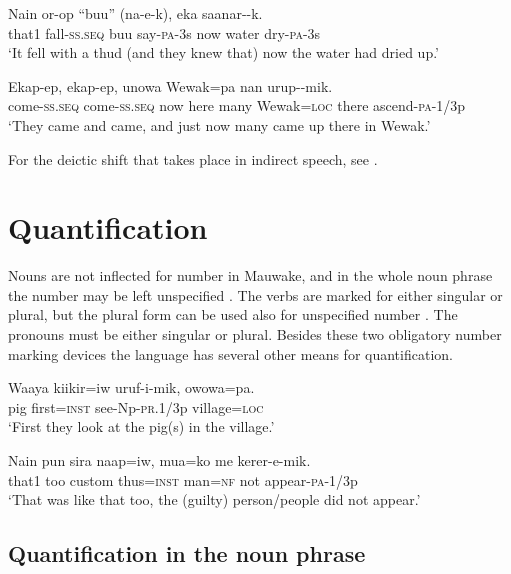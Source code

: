 \ea%
\label{ex:6:x475}
\gll Nain  or-op  ``buu''  (na-e-k),    eka  saanar--k. \\
that1  fall-\textsc{ss}.\textsc{seq}  buu  say-\textsc{pa}-3s  now  water  dry-\textsc{pa}-3s\\
\glt `It fell with a thud (and they knew that) now the water had dried up.'
\z

\ea%
\label{ex:6:x1891}
\gll Ekap-ep,  ekap-ep,     unowa  Wewak=pa nan  urup--mik.\\
come-\textsc{ss}.\textsc{seq}  come-\textsc{ss}.\textsc{seq}  now  here  many  Wewak=\textsc{loc} there  ascend-\textsc{pa}-1/3p \\
\glt `They came and came, and just now many came up there in Wewak.'
\z

For the deictic shift that takes place in indirect speech, see .

\section{Quantification}

Nouns are not inflected for number in Mauwake, and in the whole noun phrase the number may be left unspecified . The verbs are marked for either singular or plural, but the plural form can be used also for unspecified number . The pronouns must be either singular or plural. Besides these two obligatory number marking devices the language has several other means for quantification.

\ea%
\label{ex:6:x1284}
\gll Waaya  kiikir=iw  uruf-i-mik,  owowa=pa. \\
pig  first=\textsc{inst}  see-Np-\textsc{pr}.1/3p  village=\textsc{loc} \\
\glt `First they look at the pig(s) in the village.'
\z

\ea%
\label{ex:6:x1285}
\gll Nain  pun  sira  naap=iw,  mua=ko  me  kerer-e-mik. \\
that1  too  custom  thus=\textsc{inst}  man=\textsc{nf}  not  appear-\textsc{pa}-1/3p\\
\glt `That was like that too, the (guilty) person/people did not appear.'
\z

\subsection{Quantification in the noun phrase}

